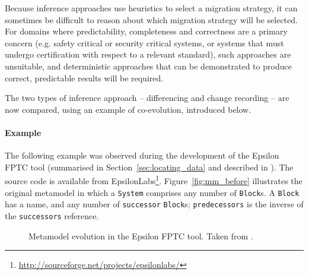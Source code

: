 Because inference approaches use heuristics to select a migration strategy, it can sometimes be difficult to reason about which migration strategy will be selected. For domains where predictability, completeness and correctness are a primary concern (e.g. safety critical or security critical systems, or systems that must undergo certification with respect to a relevant standard), such approaches are unsuitable, and deterministic approaches that can be demonstrated to produce correct, predictable results will be required. 

The two types of inference approach -- differencing and change recording -- are now compared, using an example of co-evolution, introduced below.

\paragraph{Example}
\label{subsubsec:example}
The following example was observed during the development of the Epsilon FPTC tool (summarised in Section~\ref{sec:locating_data} and described in \cite{paige08fptc}). The source code is available from EpsilonLabs\footnote{\url{http://sourceforge.net/projects/epsilonlabs/}}. Figure~\ref{fig:mm_before} illustrates the original metamodel in which a \texttt{System} comprises any number of \texttt{Block}s. A \texttt{Block} has a name, and any number of \texttt{successor} \texttt{Block}s; \texttt{predecessors} is the inverse of the \texttt{successors} reference.

\begin{figure}[htbp]
	\centering
	\caption[Metamodel evolution in the Epsilon FPTC tool]{Metamodel evolution in the Epsilon FPTC tool. Taken from \cite{rose09analysis}.}
\label{fig:fptc_mm}
\end{figure}

